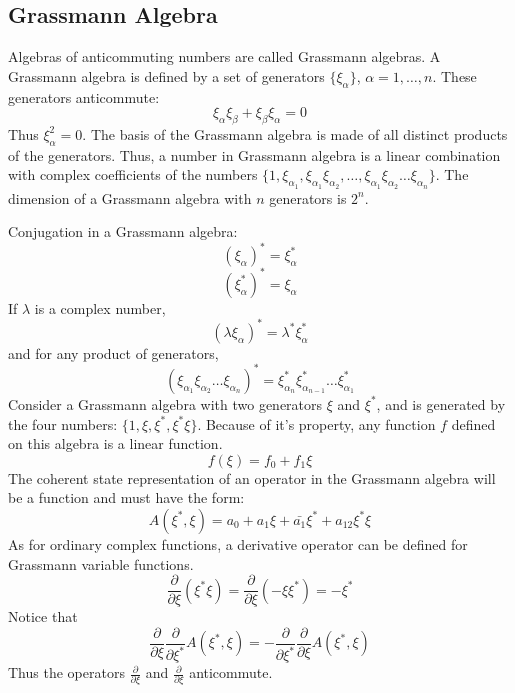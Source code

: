 \documentclass[12pt]{article}
\begin{document}
\subsection*{Grassmann Algebra}
Algebras of anticommuting numbers are called Grassmann algebras. A Grassmann 
algebra is defined by a set of generators $\{\xi_\alpha\}$, $\alpha=1,\dots,n$. 
These generators anticommute:
\begin{equation*}
    \xi_\alpha\xi_\beta+\xi_\beta\xi_\alpha=0
\end{equation*}
Thus $\xi_\alpha^2=0$. 
The basis of the Grassmann algebra is made of all distinct products of the 
generators. Thus, a number in Grassmann algebra is a linear combination with 
complex coefficients of the numbers $\{1,\xi_{\alpha_1},\xi_{\alpha_1}
\xi_{\alpha_2},\dots,\xi_{\alpha_1}\xi_{\alpha_2}\dots\xi_{\alpha_n}\}$. The 
dimension of a Grassmann algebra with $n$ generators is $2^n$.

Conjugation in a Grassmann algebra:
\begin{equation*}
    (\xi_\alpha)^*=\xi_\alpha^*
\end{equation*}
\begin{equation*}
    (\xi_\alpha^*)^*=\xi_\alpha
\end{equation*}
If $\lambda$ is a complex number,
\begin{equation*}
    (\lambda\xi_\alpha)^*=\lambda^*\xi_\alpha^*
\end{equation*}
and for any product of generators,
\begin{equation}
    (\xi_{\alpha_1}\xi_{\alpha_2}\dots\xi_{\alpha_n})^*=
    \xi_{\alpha_n}^*\xi_{\alpha_{n-1}}^*\dots\xi_{\alpha_1}^*
\end{equation}
Consider a Grassmann algebra with two generators $\xi$ and $\xi^*$, and is 
generated by the four numbers: $\{1,\xi,\xi^*,\xi^*\xi\}$. Because of it's 
property, any function $f$ defined on this algebra is a linear function.
\begin{equation*}
    f(\xi)=f_0+f_1\xi
\end{equation*}
The coherent state representation of an operator in the Grassmann algebra will 
be a function and must have the form:
\begin{equation*}
    A(\xi^*,\xi)=a_0+a_1\xi+\bar{a_1}\xi^*+a_{12}\xi^*\xi
\end{equation*}
As for ordinary complex functions, a derivative operator can be defined for 
Grassmann variable functions.
\begin{equation*}
    \frac{\partial}{\partial\xi}(\xi^*\xi)=
    \frac{\partial}{\partial\xi}(-\xi\xi^*)=-\xi^*
\end{equation*}
Notice that
\begin{equation*}
    \frac{\partial}{\partial\xi}\frac{\partial}{\partial\xi^*}A(\xi^*,\xi)=
    -\frac{\partial}{\partial\xi^*}\frac{\partial}{\partial\xi}A(\xi^*,\xi)
\end{equation*}
Thus the operators $\frac{\partial}{\partial\xi}$ and 
$\frac{\partial}{\partial\xi}$ anticommute.
\end{document}
